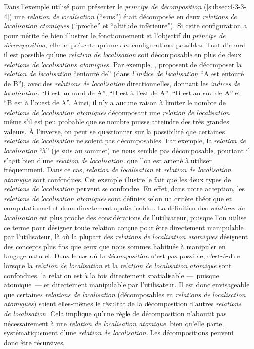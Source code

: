 Dans l'exemple utilisé pour présenter le \emph{principe de
  décomposition} (\autoref{subsec:4-3-3-4}) une \emph{relation de
  localisation} (\enquote{sous}) était décomposée en deux
\emph{relations de localisation atomiques} (\enquote{proche} et
\enquote{altitude inférieure}). Si cette configuration a pour mérite
de bien illustrer le fonctionnement et l'objectif du \emph{principe de
  décomposition,} elle ne présente qu'une des configurations
possibles. Tout d'abord il est possible qu'une \emph{relation de
  localisation} soit décomposable en plus de deux \emph{relations de
  localisations atomiques.} Par exemple, \textcite{Vanegas2011},
proposent de décomposer la \emph{relation de localisation}
\enquote{entouré de} (dans \emph{l'indice de localisation} \enquote{A
  est entouré de B}), avec des \emph{relations de localisation}
directionnelles, donnant les \emph{indices de localisation:}
\enquote{B est au nord de A}, \enquote{B est à l'est de A}, \enquote{B
  est au sud de A} et \enquote{B est à l'ouest de A}. Ainsi, il n'y a
aucune raison à limiter le nombre de \emph{relations de localisation
  atomiques} décomposant une \emph{relation de localisation,} même
s'il est peu probable que se nombre puisse atteindre des très grandes
valeurs. À l'inverse, on peut se questionner sur la possibilité que
certaines \emph{relations de localisation} ne soient pas
décomposables. Par exemple, la \emph{relation de localisation}
\enquote{à} (\eg je suis au sommet) ne nous semble pas décomposable,
pourtant il s'agit bien d'une \emph{relation de localisation,} que
l'on est amené à utiliser fréquemment. Dans ce cas, \emph{relation de
  localisation} et \emph{relation de localisation atomique} sont
confondues. Cet exemple illustre le fait que les deux types de
\emph{relations de localisation} peuvent se confondre. En effet, dans
notre acception, les \emph{relations de localisation atomiques} sont
définies selon un critère théorique et computationnel et donc
directement spatialisables. La définition des \emph{relations de
  localisation} est plus proche des considérations de l'utilisateur,
puisque l'on utilise ce terme pour désigner toute relation conçue pour
être directement manipulable par l'utilisateur, là où la plupart des
\emph{relations de localisation atomiques} désignent des concepts plus
fins que ceux que nous sommes habitués à manipuler en langage
naturel. Dans le cas où la \emph{décomposition} n'est pas possible,
c'est-à-dire lorsque la \emph{relation de localisation} et la
\emph{relation de localisation atomique} sont confondues, la relation
est à la fois directement spatialisable ---~puisque atomique~--- et
directement manipulable par l'utilisateur. Il est donc envisageable
que certaines \emph{relations de localisation} (décomposables en
\emph{relations de localisation atomiques}) soient elles-mêmes le
résultat de la décomposition d'autres \emph{relations de
  localisation.} Cela implique qu'une règle de décomposition n’aboutit
pas nécessairement à une \emph{relation de localisation atomique,}
bien qu'elle parte, systématiquement d'une \emph{relation de
  localisation.} Les décompositions peuvent donc être récursives.

